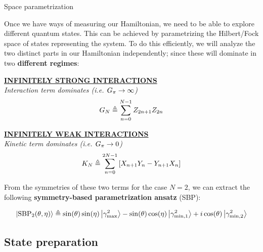 \documentclass[9pt, handout, aspectratio=169]{beamer}	%
\begin{document}
\begin{frame}{Space parametrization}

	Once we have ways of measuring our Hamiltonian, we need to be able to explore different quantum states. This can be achieved by parametrizing the Hilbert/Fock space of states representing the system. To do this efficiently, we will analyze the two distinct parts in our Hamiltonian independently; since these will dominate in two \textbf{different regimes}:

	\begin{multicols}{2}

		\begin{center}
			\underline{\textbf{INFINITELY STRONG INTERACTIONS}}\\
			\small{\emph{Interaction term dominates (i.e. $G_{\pi} \rightarrow \infty$)}}
			\begin{gather*}
				G_{N} \triangleq \sum_{n=0}^{N-1} Z_{2n+1}Z_{2n}
			\end{gather*}
		\end{center}

		\columnbreak

		\begin{center}
			\underline{\textbf{INFINITELY WEAK INTERACTIONS}}\\
			\small{\emph{Kinetic term dominates (i.e. $G_{\pi} \rightarrow 0$)}}
			\begin{gather*}
			  K_{N} \triangleq \sum_{n=0}^{2N-1} \qty[ X_{n+1}Y_{n} - Y_{n+1}X_{n} ]
			\end{gather*}
		\end{center}

	\end{multicols}

	\pause

	From the symmetries of these two terms for the case $N=2$, we can extract the following \textbf{symmetry-based parametrization ansatz} (SBP):

	\begin{gather*}
	  \ket{\text{SBP}_{2} \qty(\theta, \eta)} \triangleq
	    \sin(\theta)\sin(\eta) \ket{\gamma_{\text{max}}^2} -
	    \sin(\theta)\cos(\eta) \ket{\gamma_{\text{min},1}^2} + i
	    \cos(\theta) \ket{\gamma_{\text{min},2}^2}
	\end{gather*}

\end{frame}


\subsection{State preparation}
\end{document}
